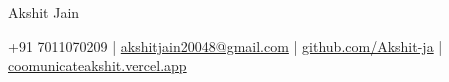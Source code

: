 \centerline{\Huge Akshit Jain}

\vspace{5pt}

\centerline{
+91 7011070209 |
\href{mailto:akshitjain20048@gmail.com}{akshitjain20048@gmail.com} |
\href{https://github.com/Akshit-ja}{github.com/Akshit-ja} |
\href{https://coomunicateakshit.vercel.app/}{coomunicateakshit.vercel.app}
}

\vspace{-10pt}